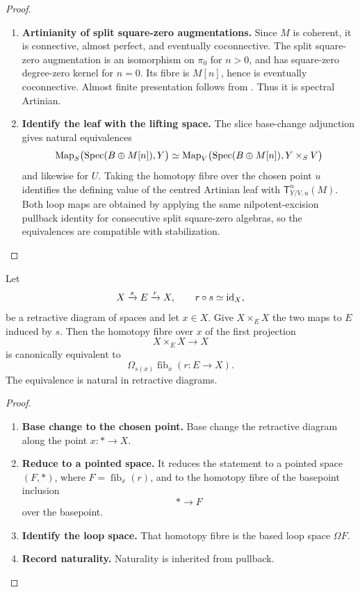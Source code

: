\begin{proof}
\leavevmode
\begin{enumerate}[label=\textup{(\arabic*)}]
    \item \textbf{Artinianity of split square-zero augmentations.}
    Since \(M\) is coherent, it is connective, almost perfect, and eventually
    coconnective. The split square-zero augmentation is an isomorphism on
    \(\pi_0\) for \(n>0\), and has square-zero degree-zero kernel for \(n=0\).
    Its fibre is \(M[n]\), hence is eventually coconnective. Almost finite
    presentation follows from . Thus it is
    spectral Artinian.
    \item \textbf{Identify the leaf with the lifting space.}
    The slice base-change adjunction gives natural equivalences
    \[
        \operatorname{Map}_S\bigl(\operatorname{Spec}(B\oplus M[n]),Y\bigr)
        \simeq
        \operatorname{Map}_V
        \bigl(\operatorname{Spec}(B\oplus M[n]),Y\times_SV\bigr)
    \]
    and likewise for \(U\). Taking the homotopy fibre over the chosen point \(u\)
    identifies the defining value of the centred Artinian leaf with
    \(\mathsf T^n_{Y/V,u}(M)\). Both loop maps are obtained by applying the same
    nilpotent-excision pullback identity for consecutive split square-zero
    algebras, so the equivalences are compatible with stabilization.
\end{enumerate}
\end{proof}

\begin{lemma}
\label{lem:retractive-self-intersection-loop}
Let
\[
    X\xrightarrow{s}E\xrightarrow{r}X,
    \qquad r\circ s\simeq\operatorname{id}_X,
\]
be a retractive diagram of spaces and let \(x\in X\). Give
\(X\times_E X\) the two maps to \(E\) induced by \(s\). Then the homotopy
fibre over \(x\) of the first projection
\[
    X\times_E X\longrightarrow X
\]
is canonically equivalent to
\[
    \Omega_{s(x)}\operatorname{fib}_x(r:E\to X).
\]
The equivalence is natural in retractive diagrams.
\end{lemma}

\begin{proof}
\leavevmode
\begin{enumerate}[label=\textup{(\arabic*)}]
    \item \textbf{Base change to the chosen point.}
    Base change the retractive diagram along the point \(x:*\to X\).
    \item \textbf{Reduce to a pointed space.}
    It reduces
    the statement to a pointed space \((F,*)\), where \(F=\operatorname{fib}_x(r)\),
    and to the homotopy fibre of the basepoint inclusion
    \[
        *\longrightarrow F
    \]
    over the basepoint.
    \item \textbf{Identify the loop space.}
    That homotopy fibre is the based loop space
    \(\Omega F\).
    \item \textbf{Record naturality.}
    Naturality is inherited from pullback.
\end{enumerate}
\end{proof}


